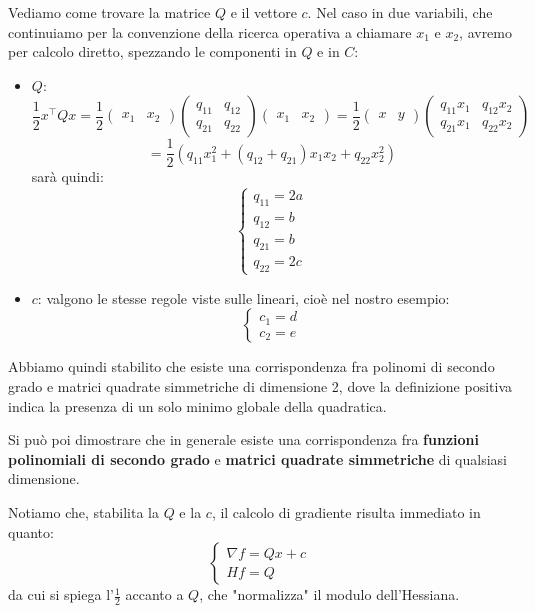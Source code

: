 \documentclass[a4paper,11pt]{article}
\begin{document}
Vediamo come trovare la matrice $Q$ e il vettore $c$. 
Nel caso in due variabili, che continuiamo per la convenzione della ricerca operativa a chiamare $x_1$ e $x_2$, avremo per calcolo diretto, spezzando le componenti in $Q$ e in $C$:
\begin{itemize}
	\item $Q$:
		$$
		\frac{1}{2}x^\intercal Q x = 
		\frac{1}{2}
		\begin{pmatrix}
			x_1 & x_2
		\end{pmatrix}
		\begin{pmatrix}
			q_{11} & q_{12} \\ 
			q_{21} & q_{22}
		\end{pmatrix}
		\begin{pmatrix}
			x_1 & x_2
		\end{pmatrix}
		=
		\frac{1}{2}
		\begin{pmatrix}
			x & y
		\end{pmatrix}
		\begin{pmatrix}
			q_{11} x_1 & q_{12} x_2 \\ 
			q_{21} x_1 & q_{22} x_2
		\end{pmatrix}
		$$
		$$
		= \frac{1}{2}\left( q_{11} x_1^2 + (q_{12} + q_{21}) x_1 x_2 + q_{22} x_2^2 \right)
		$$
		sarà quindi:
		\[
			\begin{cases}
				q_{11} = 2a \\ 
				q_{12} = b \\
				q_{21} = b \\
				q_{22} = 2c
			\end{cases}
		\]
	\item $c$: valgono le stesse regole viste sulle lineari, cioè nel nostro esempio:
		\[
			\begin{cases}
				c_1 = d \\ 
				c_2 = e
			\end{cases}
		\]
\end{itemize}

Abbiamo quindi stabilito che esiste una corrispondenza fra polinomi di secondo grado e matrici quadrate simmetriche di dimensione 2, dove la definizione positiva indica la presenza di un solo minimo globale della quadratica.

Si può poi dimostrare che in generale esiste una corrispondenza fra \textbf{funzioni polinomiali di secondo grado} e \textbf{matrici quadrate simmetriche} di qualsiasi dimensione.

Notiamo che, stabilita la $Q$ e la $c$, il calcolo di gradiente risulta immediato in quanto:
\[
	\begin{cases}
		\nabla f = Qx + c \\ 
		Hf = Q
	\end{cases}
\]
da cui si spiega l'$\frac{1}{2}$ accanto a $Q$, che "normalizza" il modulo dell'Hessiana.
\end{document}
